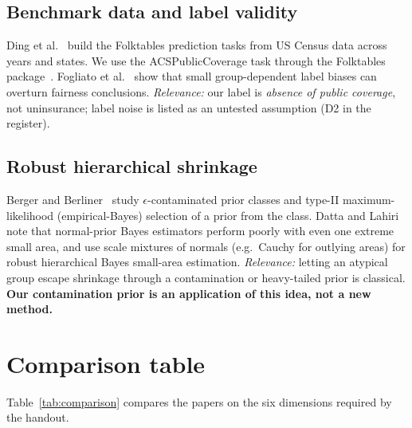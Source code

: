 \documentclass[10pt]{article}
\begin{document}
\subsection{Benchmark data and label validity}
Ding et al.~\cite{ding2021} build the Folktables prediction tasks from US Census data across years and states. We use
the ACSPublicCoverage task through the Folktables package~\cite{folktables}. Fogliato et al.~\cite{fogliato2020} show
that small group-dependent label biases can overturn fairness conclusions. \emph{Relevance:} our label is
\emph{absence of public coverage}, not uninsurance; label noise is listed as an untested assumption (D2 in the register).

\subsection{Robust hierarchical shrinkage}
Berger and Berliner~\cite{berger1986} study $\epsilon$-contaminated prior classes and type-II maximum-likelihood
(empirical-Bayes) selection of a prior from the class. Datta and Lahiri~\cite{datta1995} note that normal-prior Bayes
estimators perform poorly with even one extreme small area, and use scale mixtures of normals (e.g.\ Cauchy for outlying
areas) for robust hierarchical Bayes small-area estimation. \emph{Relevance:} letting an atypical group escape shrinkage
through a contamination or heavy-tailed prior is classical. \textbf{Our contamination prior is an application of this
idea, not a new method.}

\section{Comparison table}
Table~\ref{tab:comparison} compares the papers on the six dimensions required by the handout.
\end{document}
